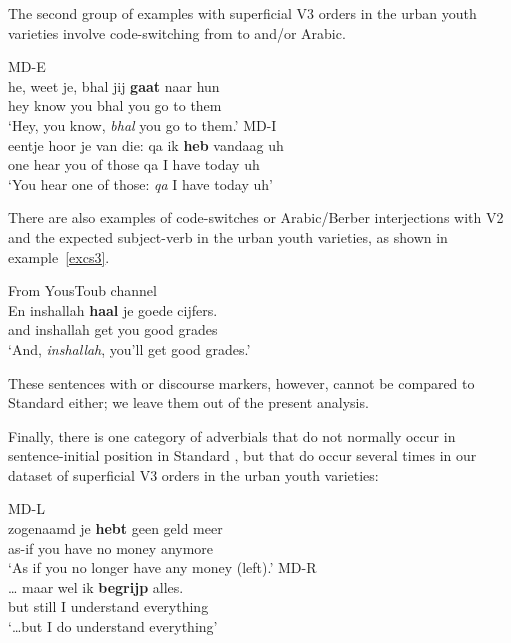\documentclass[output=paper]{langsci/langscibook}
\begin{document}
The second group of examples with superficial V3 orders in the  urban
youth varieties involve code-switching from  to  and/or Arabic.

\ea
    \ea MD-E\\
    \gll he, weet je, bhal jij \textbf{gaat} naar hun\\
    hey know you bhal you go to them\\
    \trans \enquote*{Hey, you know, \emph{bhal} you go to them.}
    \ex MD-I\\
    \gll eentje hoor je van die: qa ik \textbf{heb} vandaag uh\\
    one hear you of those qa I have today uh\\
    \trans \enquote*{You hear one of those: \emph{qa} I have today uh}
    \z
\z

\noindent There are also examples of code-switches or Arabic/Berber
interjections with V2 and the expected subject-verb in the urban youth
varieties, as shown in example~\eqref{excs3}.

\ea From YousToub channel\\
    \gll\label{excs3}En inshallah \textbf{haal} je goede cijfers.\\
    and inshallah get you good grades\\
    \trans \enquote*{And, \emph{inshallah}, you'll get good grades.}
\z

\noindent These sentences with  or  discourse markers,
however, cannot be compared to Standard  either; we leave them out
of the present analysis.

Finally, there is one category of adverbials that do not normally occur in
sentence-initial position in Standard , but that do occur several
times in our dataset of superficial V3 orders in the
 urban youth varieties:

\ea
    \ea MD-L\\
    \gll zogenaamd je \textbf{hebt} geen geld meer\\
    as-if you have no money anymore\\
    \trans \enquote*{As if you no longer have any money (left).}
    \ex MD-R\\
    \gll \dots{} maar wel ik \textbf{begrijp} alles.\\
    {} but still I understand everything\\
    \trans \enquote*{\dots but I do understand everything}
    \z
\z
\end{document}
